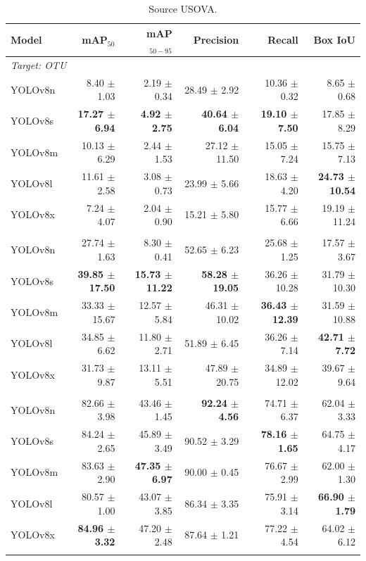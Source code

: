 \documentclass[10pt]{article}
\begin{document}
\begin{table}[t]
\centering
\small
\caption{Source USOVA.}
\label{tab:yolo_src_usova}
\begin{tabular}{lrrrrr}
\toprule
Model & mAP$_{50}$ & mAP$_{50-95}$ & Precision & Recall & Box IoU \\
\midrule
\multicolumn{6}{l}{\textit{Target: OTU}} \\
YOLOv8n & 8.40 $\pm$ 1.03 & 2.19 $\pm$ 0.34 & 28.49 $\pm$ 2.92 & 10.36 $\pm$ 0.32 & 8.65 $\pm$ 0.68 \\
YOLOv8s & \textbf{17.27 $\pm$ 6.94} & \textbf{4.92 $\pm$ 2.75} & \textbf{40.64 $\pm$ 6.04} & \textbf{19.10 $\pm$ 7.50} & 17.85 $\pm$ 8.29 \\
YOLOv8m & 10.13 $\pm$ 6.29 & 2.44 $\pm$ 1.53 & 27.12 $\pm$ 11.50 & 15.05 $\pm$ 7.24 & 15.75 $\pm$ 7.13 \\
YOLOv8l & 11.61 $\pm$ 2.58 & 3.08 $\pm$ 0.73 & 23.99 $\pm$ 5.66 & 18.63 $\pm$ 4.20 & \textbf{24.73 $\pm$ 10.54} \\
YOLOv8x & 7.24 $\pm$ 4.07 & 2.04 $\pm$ 0.90 & 15.21 $\pm$ 5.80 & 15.77 $\pm$ 6.66 & 19.19 $\pm$ 11.24 \\
\addlinespace[2pt]
\multicolumn{6}{l}{\textit{Target: OVATUS}} \\
YOLOv8n & 27.74 $\pm$ 1.63 & 8.30 $\pm$ 0.41 & 52.65 $\pm$ 6.23 & 25.68 $\pm$ 1.25 & 17.57 $\pm$ 3.67 \\
YOLOv8s & \textbf{39.85 $\pm$ 17.50} & \textbf{15.73 $\pm$ 11.22} & \textbf{58.28 $\pm$ 19.05} & 36.26 $\pm$ 10.28 & 31.79 $\pm$ 10.30 \\
YOLOv8m & 33.33 $\pm$ 15.67 & 12.57 $\pm$ 5.84 & 46.31 $\pm$ 10.02 & \textbf{36.43 $\pm$ 12.39} & 31.59 $\pm$ 10.88 \\
YOLOv8l & 34.85 $\pm$ 6.62 & 11.80 $\pm$ 2.71 & 51.89 $\pm$ 6.45 & 36.26 $\pm$ 7.14 & \textbf{42.71 $\pm$ 7.72} \\
YOLOv8x & 31.73 $\pm$ 9.87 & 13.11 $\pm$ 5.51 & 47.89 $\pm$ 20.75 & 34.89 $\pm$ 12.02 & 39.67 $\pm$ 9.64 \\
\addlinespace[2pt]
\multicolumn{6}{l}{\textit{Target: USOVA}} \\
YOLOv8n & 82.66 $\pm$ 3.98 & 43.46 $\pm$ 1.45 & \textbf{92.24 $\pm$ 4.56} & 74.71 $\pm$ 6.37 & 62.04 $\pm$ 3.33 \\
YOLOv8s & 84.24 $\pm$ 2.65 & 45.89 $\pm$ 3.49 & 90.52 $\pm$ 3.29 & \textbf{78.16 $\pm$ 1.65} & 64.75 $\pm$ 4.17 \\
YOLOv8m & 83.63 $\pm$ 2.90 & \textbf{47.35 $\pm$ 6.97} & 90.00 $\pm$ 0.45 & 76.67 $\pm$ 2.99 & 62.00 $\pm$ 1.30 \\
YOLOv8l & 80.57 $\pm$ 1.00 & 43.07 $\pm$ 3.85 & 86.34 $\pm$ 3.35 & 75.91 $\pm$ 3.14 & \textbf{66.90 $\pm$ 1.79} \\
YOLOv8x & \textbf{84.96 $\pm$ 3.32} & 47.20 $\pm$ 2.48 & 87.64 $\pm$ 1.21 & 77.22 $\pm$ 4.54 & 64.02 $\pm$ 6.12 \\
\addlinespace[2pt]
\bottomrule
\end{tabular}
\end{table}
\end{document}
